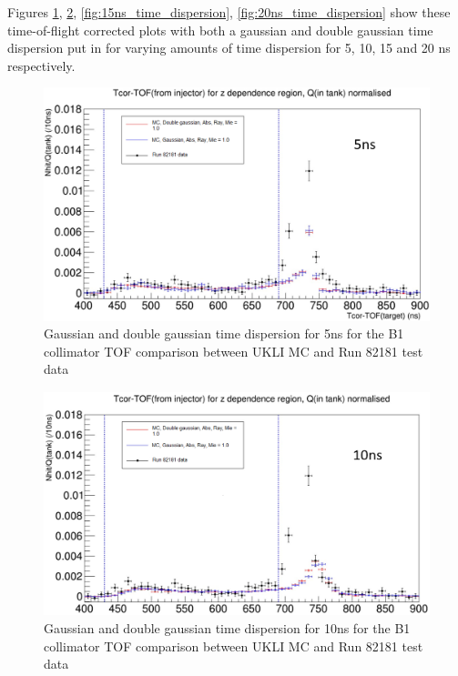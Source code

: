 Figures \ref{fig:5ns_time_dispersion}, \ref{fig:10ns_time_dispersion}, \ref{fig:15ns_time_dispersion}, \ref{fig:20ns_time_dispersion} show these time-of-flight corrected plots with both a gaussian and double gaussian time dispersion put in for varying amounts of time dispersion for 5, 10, 15 and 20 ns respectively.


\begin{figure}
    \centering
    \includegraphics[width=\textwidth]{Figures/time_dispersion_TOF_5ns.PNG}
    \caption{Gaussian and double gaussian time dispersion for 5ns for the B1 collimator TOF comparison between UKLI MC and Run 82181 test data}
    \label{fig:5ns_time_dispersion}
\end{figure}

\begin{figure}
    \centering
    \includegraphics[width=\textwidth]{Figures/time_dispersion_TOF_10ns.PNG}
    \caption{Gaussian and double gaussian time dispersion for 10ns for the B1 collimator TOF comparison between UKLI MC and Run 82181 test data}
    \label{fig:10ns_time_dispersion}
\end{figure}

